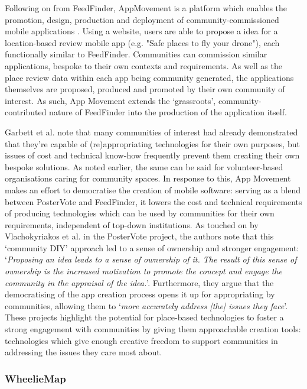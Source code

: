 Following on from FeedFinder, AppMovement is a platform which enables the promotion, design, production and deployment of community-commissioned mobile applications \citep{Garbett2016}. Using a website, users are able to propose a idea for a location-based review mobile app (e.g. "Safe places to fly your drone"), each functionally similar to FeedFinder. Communities can commission similar applications, bespoke to their own contexts and requirements. As well as the place review data within each app being community generated, the applications themselves are proposed, produced and promoted by their own community of interest. As such, App Movement extends the `grassroots', community-contributed nature of FeedFinder into the production of the application itself. 

Garbett et al. note that many communities of interest had already demonstrated that they're capable of (re)appropriating technologies for their own purposes, but issues of cost and technical know-how frequently prevent them creating their own bespoke solutions. As noted earlier, the same can be said for volunteer-based organisations caring for community spaces. In response to this, App Movement makes an effort to democratise the creation of mobile software: serving as a blend between PosterVote and FeedFinder, it lowers the cost and technical requirements of producing technologies which can be used by communities for their own requirements, independent of top-down institutions. As touched on by Vlachokyriakos et al. in the PosterVote project, the authors note that this `community DIY' approach led to a sense of ownership and stronger engagement: `\textit{Proposing an idea leads to a sense of ownership of it. The result of this sense of ownership is the increased motivation to promote the concept and engage the community in the appraisal of the idea.}'. Furthermore, they argue that the democratising of the app creation process opens it up for appropriating by communities, allowing them to `\textit{more accurately address [the] issues they face}'. These projects highlight the potential for place-based technologies to foster a strong engagement with communities by giving them approachable creation tools: technologies which give enough creative freedom to support communities in addressing the issues they care most about.

\subsubsection{WheelieMap}

